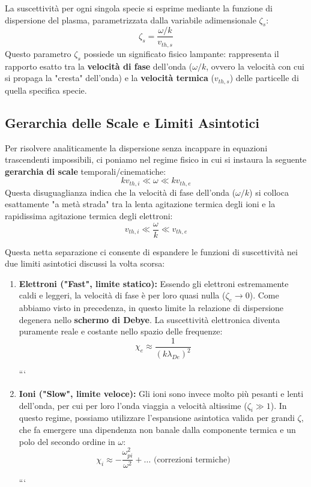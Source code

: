 La suscettività per ogni singola specie si esprime mediante la funzione di dispersione del plasma, parametrizzata dalla variabile adimensionale $\zeta_s$:
\begin{equation}
\zeta_s = \frac{\omega / k}{v_{th, s}}
\end{equation}
Questo parametro $\zeta_s$ possiede un significato fisico lampante: rappresenta il rapporto esatto tra la \textbf{velocità di fase} dell'onda ($\omega/k$, ovvero la velocità con cui si propaga la "cresta" dell'onda) e la \textbf{velocità termica} ($v_{th, s}$) delle particelle di quella specifica specie.

\subsection{Gerarchia delle Scale e Limiti Asintotici}
Per risolvere analiticamente la dispersione senza incappare in equazioni trascendenti impossibili, ci poniamo nel regime fisico in cui si instaura la seguente \textbf{gerarchia di scale} temporali/cinematiche:
\begin{equation}
k v_{th, i} \ll \omega \ll k v_{th, e}
\end{equation}
Questa disuguaglianza indica che la velocità di fase dell'onda ($\omega/k$) si colloca esattamente "a metà strada" tra la lenta agitazione termica degli ioni e la rapidissima agitazione termica degli elettroni:
\begin{equation}
v_{th, i} \ll \frac{\omega}{k} \ll v_{th, e}
\end{equation}

Questa netta separazione ci consente di espandere le funzioni di suscettività nei due limiti asintotici discussi la volta scorsa:

\begin{enumerate}
\item \textbf{Elettroni ("Fast", limite statico):} Essendo gli elettroni estremamente caldi e leggeri, la velocità di fase è per loro quasi nulla ($\zeta_e \to 0$). Come abbiamo visto in precedenza, in questo limite la relazione di dispersione degenera nello \textbf{schermo di Debye}. La suscettività elettronica diventa puramente reale e costante nello spazio delle frequenze:
\begin{equation}
\chi_e \approx \frac{1}{(k \lambda_{De})^2}
\end{equation}

```
\item \textbf{Ioni ("Slow", limite veloce):} Gli ioni sono invece molto più pesanti e lenti dell'onda, per cui per loro l'onda viaggia a velocità altissime ($\zeta_i \gg 1$). In questo regime, possiamo utilizzare l'espansione asintotica valida per grandi $\zeta$, che fa emergere una dipendenza non banale dalla componente termica e un polo del secondo ordine in $\omega$:
\begin{equation}
    \chi_i \approx - \frac{\omega_{pi}^2}{\omega^2} + \dots \text{ (correzioni termiche)}
\end{equation}

```

\end{enumerate}

